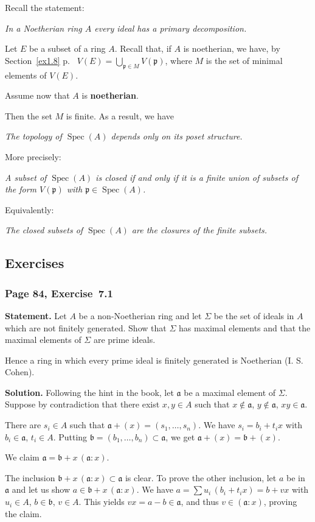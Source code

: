 \documentclass[12pt,letterpaper]{article}%
\newcommand{\mf}{\mathfrak}
\newcommand{\aaa}{\mf a}
\newcommand{\bbb}{\mf b}
\newcommand{\ppp}{\mf p}
\newcommand{\Spec}{\operatorname{Spec}}\newcommand{\Sp}{\operatorname{Spec}}
\newcommand{\nn}{\noindent}
\begin{document}
Recall the statement:

\nn\emph{In a Noetherian ring $A$ every ideal has a primary decomposition.}

Let $E$ be a subset of a ring $A$. Recall that, if $A$ is noetherian, we have, by Section~\ref{ex1.8} p.~\pageref{ex1.8} $V(E)=\bigcup_{\ppp\in M}V(\ppp)$, where $M$ is the set of minimal elements of $V(E)$. 

Assume now that $A$ is \textbf{noetherian}. 

Then the set $M$ is finite. As a result, we have

\nn\emph{The topology of $\Spec(A)$ depends only on its poset structure.}

More precisely:

\nn\emph{A subset of $\Spec(A)$ is closed if and only if it is a finite union of subsets of the form $V(\ppp)$ with $\ppp\in\Spec(A)$.}

Equivalently:

\nn\emph{The closed subsets of $\Spec(A)$ are the closures of the finite subsets.}

\subsection{Exercises}%

\subsubsection{Page 84, Exercise~7.1}%

\textbf{Statement.} Let $A$ be a non-Noetherian ring and let $\Sigma$ be the set of ideals in $A$ which are not finitely generated. Show that $\Sigma$ has maximal elements and that the maximal elements of $\Sigma$ are prime ideals.

Hence a ring in which every prime ideal is finitely generated is Noetherian (I. S. Cohen).

\nn\textbf{Solution.} Following the hint in the book, let $\aaa$ be a maximal element of $\Sigma$. Suppose by contradiction that there exist $x,y\in A$ such that $x\notin\aaa$, $y\notin\aaa$, $xy\in\aaa$. 

There are $s_i\in A$ such that $\aaa+(x)=(s_1,\dots,s_n)$. We have $s_i=b_i+t_ix$ with $b_i\in\aaa$, $t_i\in A$. Putting $\bbb=(b_1,\dots,b_n)\subset\aaa$, we get $\aaa+(x)=\bbb+(x)$. 

We claim $\aaa=\bbb+x\,(\aaa:x)$. 

The inclusion $\bbb+x\,(\aaa:x)\subset\aaa$ is clear. To prove the other inclusion, let $a$ be in $\aaa$ and let us show $a\in\bbb+x\,(\aaa:x)$. We have $a=\sum u_i\,(b_i+t_ix)=b+vx$ with $u_i\in A$, $b\in\bbb$, $v\in A$. This yields $vx=a-b\in\aaa$, and thus $v\in(\aaa:x)$, proving the claim.
\end{document}
